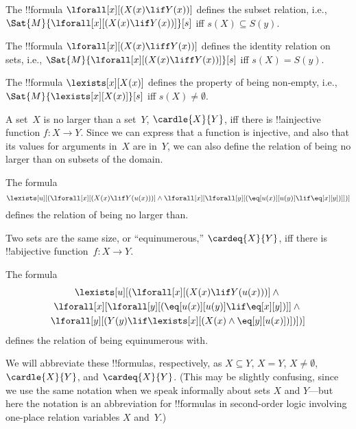 \documentclass[../../../include/open-logic-section]{subfiles}
\begin{document}


\begin{prop}
The !!{formula} $\lforall[x][(X(x) \lif Y(x))]$ defines the subset
relation, i.e., $\Sat{M}{\lforall[x][(X(x) \lif Y(x))]}[s]$ iff $s(X)
\subseteq S(y)$.
\end{prop}

\begin{prop}
The !!{formula} $\lforall[x][(X(x) \liff Y(x))]$ defines the identity
relation on sets, i.e., $\Sat{M}{\lforall[x][(X(x) \liff Y(x))]}[s]$
iff $s(X) = S(y)$.
\end{prop}

\begin{prop}
The !!{formula} $\lexists[x][X(x)]$ defines the property of being
non-empty, i.e., $\Sat{M}{\lexists[x][X(x)]}[s]$ iff $s(X) \neq
\emptyset$.
\end{prop}

A set~$X$ is no larger than a set~$Y$, $\cardle{X}{Y}$, iff there is
!!a{injective} function $f\colon X \to Y$.  Since we can express that
a function is injective, and also that its values for arguments in~$X$
are in~$Y$, we can also define the relation of being no larger than on
subsets of the domain.

\begin{prop}
The formula
\[
\lexists[u][(\lforall[x][(X(x) \lif Y(u(x)))] \land \lforall[x][\lforall[y][(\eq[u(x)][u(y)] \lif
      \eq[x][y])]])]
\]
defines the relation of being no larger than.
\end{prop}

Two sets are the same size, or ``equinumerous,'' $\cardeq{X}{Y}$, iff
there is !!a{bijective} function~$f\colon X \to Y$.

\begin{prop}
The formula
\begin{multline*}
  \lexists[u][(\lforall[x][(X(x) \lif Y(u(x)))] \land {}\\
    \lforall[x][\lforall[y][(\eq[u(x)][u(y)] \lif \eq[x][y])]]
  \land {} \\\lforall[y][(Y(y) \lif \lexists[x][(X(x)
      \land \eq[y][u(x)])])])]
\end{multline*}
defines the relation of being equinumerous with.
\end{prop}

We will abbreviate these !!{formula}s, respectively, as $X \subseteq Y$,
$X = Y$, $X \neq \emptyset$, $\cardle{X}{Y}$, and
$\cardeq{X}{Y}$. (This may be slightly confusing, since we use the
same notation when we speak informally about sets $X$ and $Y$---but
here the notation is an abbreviation for !!{formula}s in second-order
logic involving one-place relation variables $X$ and~$Y$.)
\end{document}
